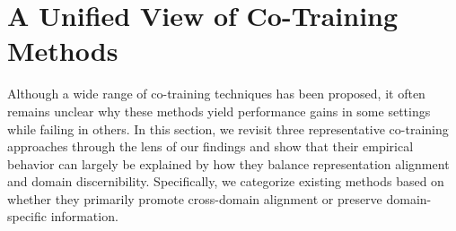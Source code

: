 


\section{A Unified View of Co-Training Methods}
Although a wide range of co-training techniques has been proposed, it often remains unclear why these methods yield performance gains in some settings while failing in others.
In this section, we revisit three representative co-training approaches through the lens of our findings and show that their empirical behavior can largely be explained by how they balance representation alignment and domain discernibility.
Specifically, we categorize existing methods based on whether they primarily promote cross-domain alignment or preserve domain-specific information.

